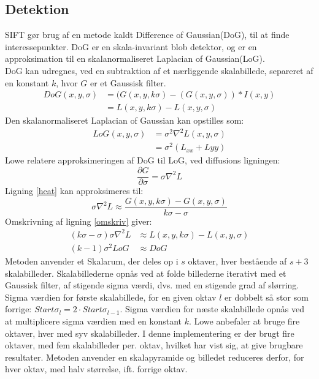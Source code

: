 \subsection{Detektion}
SIFT gør brug af en metode kaldt Difference of Gaussian(DoG), til at finde interessepunkter. DoG er en skala-invariant blob detektor, og er en approksimation til en skalanormaliseret Laplacian of Gaussian(LoG). \\ DoG kan udregnes, ved en subtraktion af et nærliggende skalabillede, separeret af en konstant $k$, hvor $G$ er et Gaussisk filter.
\begin{equation}
\begin{split}
DoG(x,y,\sigma) &= (G(x,y,k\sigma)-(G(x,y,\sigma))\ast I(x,y) \\
           &= L(x,y,k \sigma)-L(x,y,\sigma)
\end{split}
\label{dog}
\end{equation}
Den skalanormaliseret Laplacian of Gaussian kan opstilles som:
\begin{equation}
\begin{split}
LoG(x,y,\sigma)&=\sigma^2\nabla^2L(x,y,\sigma) \\
&= \sigma^2(L_{xx}+L{yy})
\end{split}
\end{equation}
Lowe relatere approksimeringen af DoG til LoG, ved diffusions ligningen:
\begin{equation}
\dfrac{\partial G}{\partial \sigma} = \sigma \nabla^2L
\label{heat}
\end{equation}
Ligning \eqref{heat} kan approksimeres til:
\begin{equation}
\sigma \nabla^2L \approx \frac{G(x,y,k\sigma) - G(x,y,\sigma)}{k\sigma-\sigma}
\label{omskriv}
\end{equation}
Omskrivning af ligning \eqref{omskriv} giver:
\begin{equation}
\begin{split}
(k\sigma-\sigma)\sigma\nabla^2L &\approx L(x,y,k\sigma)-L(x,y,\sigma) \\
(k-1)\sigma^2LoG &\approx DoG
\end{split}
\end{equation}
Metoden anvender et Skalarum, der deles op i $s$ oktaver, hver bestående af $s+3$ skalabilleder. Skalabillederne opnås ved at folde billederne iterativt med et Gaussisk filter, af stigende sigma værdi, dvs. med en stigende grad af slørring. Sigma værdien for første skalabillede, for en given oktav $l$ er dobbelt så stor som forrige: $Start\sigma_l = 2 \cdot Start\sigma_{l-1}$. Sigma værdien for næste skalabillede opnås ved at multiplicere sigma værdien med en konstant $k$. Lowe anbefaler at bruge fire oktaver, hver med syv skalabilleder. I denne implementering er der brugt fire oktaver, med fem skalabilleder per. oktav, hvilket har vist sig, at give brugbare resultater. Metoden anvender en skalapyramide og billedet reduceres derfor, for hver oktav, med halv størrelse, ift. forrige oktav. \\ 
